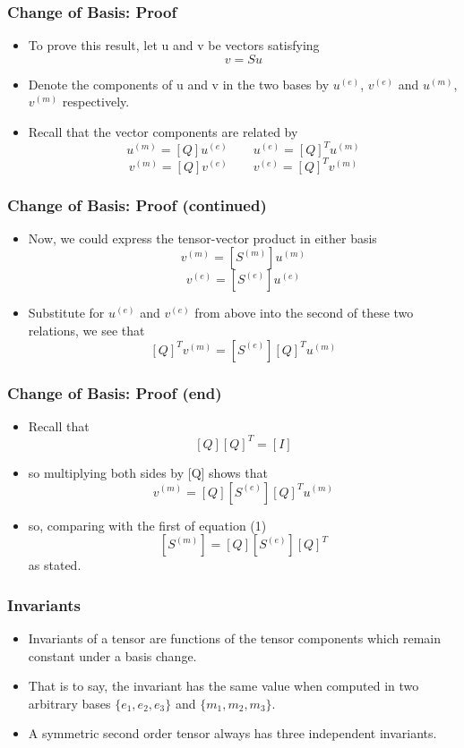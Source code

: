 \documentclass{beamer}
\begin{document}
\begin{frame}
\frametitle{Change of Basis: Proof}
\begin{itemize}
    \item To prove this result, let u and v be vectors satisfying
    \[
    v = S u
    \]
    \item Denote the components of u and v in the two bases by \(u^{(e)}\), \(v^{(e)}\) and \(u^{(m)}\), \(v^{(m)}\) respectively.
    \item Recall that the vector components are related by
    \[
    u^{(m)} = [Q] u^{(e)} \qquad u^{(e)} = [Q]^T u^{(m)}
    \]
    \[
    v^{(m)} = [Q] v^{(e)} \qquad v^{(e)} = [Q]^T v^{(m)}
    \]
\end{itemize}
\end{frame}

\begin{frame}
\frametitle{Change of Basis: Proof (continued)}
\begin{itemize}
    \item Now, we could express the tensor-vector product in either basis
    \[
    v^{(m)} = [S^{(m)}] u^{(m)}
    \]
    \[
    v^{(e)} = [S^{(e)}] u^{(e)}
    \]
    \item Substitute for \(u^{(e)}\) and \(v^{(e)}\) from above into the second of these two relations, we see that
    \[
    [Q]^T v^{(m)} = [S^{(e)}] [Q]^T u^{(m)}
    \]
\end{itemize}
\end{frame}

\begin{frame}
\frametitle{Change of Basis: Proof (end)}
\begin{itemize}
    \item Recall that
    \[
    [Q] [Q]^T = [I]
    \]
    \item so multiplying both sides by [Q] shows that
    \[
    v^{(m)} = [Q] [S^{(e)}] [Q]^T u^{(m)}
    \]
    \item so, comparing with the first of equation (1)
    \[
    [S^{(m)}] = [Q] [S^{(e)}] [Q]^T
    \]
    as stated.
\end{itemize}
\end{frame}

\begin{frame}
\frametitle{Invariants}
\begin{itemize}
    \item Invariants of a tensor are functions of the tensor components which remain constant under a basis change.
    \item That is to say, the invariant has the same value when computed in two arbitrary bases \(\{e_1, e_2, e_3\}\) and \(\{m_1, m_2, m_3\}\).
    \item A symmetric second order tensor always has three independent invariants.
\end{itemize}
\end{frame}
\end{document}

